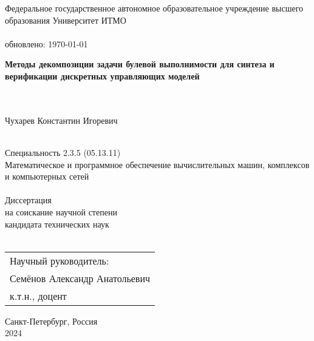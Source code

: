 \thispagestyle{empty}


\vspace{0pt plus2fill} %
\begin{center}
	Федеральное государственное автономное образовательное учреждение высшего образования Университет ИТМО \\ \ \\
	{\tiny обновлено: \today}
\end{center}

\vspace*{200pt}
\begin{center}
\textbf{\large %
Методы декомпозиции задачи булевой выполнимости для синтеза и верификации дискретных управляющих моделей
} \\ \ \\ \

{\large
Чухарев Константин Игоревич
}
\\ \

{Специальность 2.3.5 (05.13.11)} \\
{\small Математическое и программное обеспечение вычислительных машин, комплексов и компьютерных сетей} \\ \ \\
Диссертация \\ на соискание научной степени \\ кандидата технических наук \\ \ \\
\hfill\begin{tabular}{l}
Научный руководитель: \\
Семёнов Александр Анатольевич \\
к.т.н., доцент
\end{tabular}
\end{center}

\vspace{0pt plus2fill} %

\begin{center}
	Санкт-Петербург, Россия\\
	2024
\end{center}
